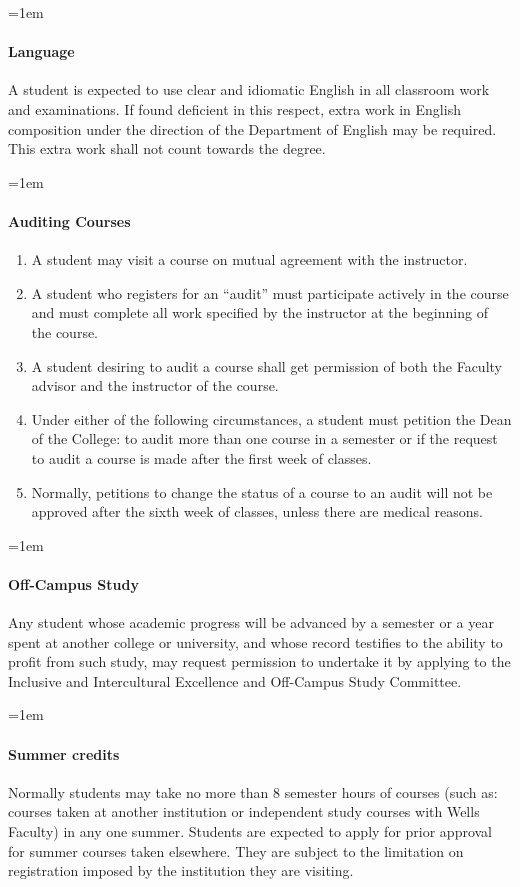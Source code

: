 \documentclass{manual}
\newcommand{\modified}[1]{}
\let\oldparagraph\paragraph
\renewcommand\paragraph{\leftskip=1em\oldparagraph}
\newcommand{\itemLevelA}{\alph*.}
\newcommand{\itemRefA}{\alph*}
\begin{document}
\paragraph{Language}
 A student is expected to use clear and idiomatic English in all classroom work and examinations. If found deficient in this respect,  extra work in English composition under the direction of the Department of English may be required. This extra work shall not count towards the degree.

\paragraph{Auditing Courses}
\begin{enumerate}[label=\itemLevelA,ref=\itemRefA]
\item A student may visit a course on mutual agreement with the instructor. 
\item A student who registers for an ``audit'' must participate actively in the course and must complete all work specified  by the instructor at the beginning of the course.
\item  A student desiring to audit a course shall get permission of both the Faculty advisor and the instructor of the course.
\item Under either of the following circumstances, a student must petition the Dean of the College:  to audit more than one course in a semester or if the request to audit a course is made after the first week of classes. 
\item Normally, petitions to change the status of a course to an audit will not be approved after the sixth week of classes, unless there are medical reasons.
\end{enumerate}

\paragraph{Off-Campus Study}
 Any student whose academic progress will be advanced by a semester or a year spent at another college or university, and whose record testifies to the ability to profit from such study, may request permission to undertake it by applying to the Inclusive and Intercultural Excellence and Off-Campus Study Committee.

\paragraph{Summer credits}
Normally students may take no more than 8 semester hours of courses (such as: courses taken at another institution or independent study courses with Wells Faculty) in any one summer. Students are expected to apply for prior approval for summer courses taken elsewhere. They are subject to the limitation on registration imposed by the institution they are visiting.\modified{5/13/93}
\end{document}
